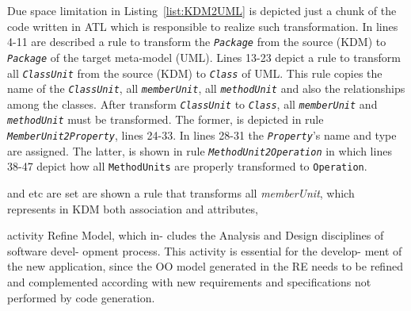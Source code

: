 \documentclass[a4paper,twoside]{article}
\newcommand*\circled[1]{\tikz[baseline=(char.base)]{
  \node[shape=circle,draw, inner sep=0.1pt] (char) {#1};}
}
\begin{document}
Due space limitation in Listing~\ref{list:KDM2UML} is depicted just a chunk of the code written in ATL which is responsible to realize such transformation. In lines 4-11 are described a rule to transform the \textit{\texttt{Package}} from the source (KDM) to \textit{\texttt{Package}} of the target meta-model (UML). Lines 13-23 depict a rule to transform all \textit{\texttt{ClassUnit}} from the source (KDM) to \textit{\texttt{Class}} of UML. This rule copies the name of the \textit{\texttt{ClassUnit}}, all \textit{\texttt{memberUnit}}, all \textit{\texttt{methodUnit}} and also the relationships among the classes. After transform \textit{\texttt{ClassUnit}} to \textit{\texttt{Class}}, all \textit{\texttt{memberUnit}} and \textit{\texttt{methodUnit}} must be transformed. The former, is depicted in rule \textit{\texttt{MemberUnit2Property}}, lines 24-33. In lines 28-31 the \textit{\texttt{Property}}'s name and type are assigned. The latter, is shown in rule \textit{\texttt{MethodUnit2Operation}} in which lines 38-47 depict how all \texttt{MethodUnits} are properly transformed to \texttt{Operation}.  

  and etc are set  are shown a rule that transforms all \textit{memberUnit}, which represents in KDM both association and attributes,      


  activity Refine Model, which in- cludes the Analysis and Design disciplines of software devel- opment process. This activity is essential for the develop- ment of the new application, since the OO model generated in the RE needs to be refined and complemented according with new requirements and specifications not performed by code generation.








\end{document}
